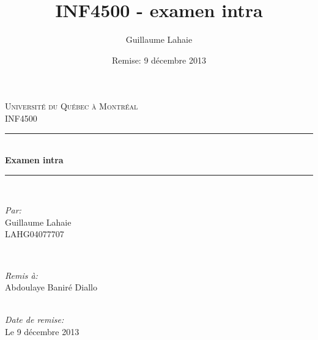 \documentclass[10.9pt]{article} %
\title{INF4500 - examen intra}
\author{Guillaume Lahaie}
\date{Remise: 9 décembre 2013}
\newcommand\blankpage{%
  \null
  \thispagestyle{empty}%
  \addtocounter{page}{-1}%
  \newpage}
\begin{document}
\fussy


\begin{titlepage}

\newcommand{\HRule}{\rule{\linewidth}{0.5mm}} %

\center %

\textsc{\LARGE Université du Québec à Montréal}\\[1.5cm] %
\textsc{\Large INF4500}\\[0.5cm] %

\HRule \\[1.5cm]
{ \huge \bfseries Examen intra}\\[0.4cm] %
\HRule \\[1.5cm]

\begin{minipage}{0.4\textwidth}
\begin{flushleft} \large
\emph{Par:}\\
Guillaume Lahaie \\ LAHG04077707 %
\end{flushleft}
\end{minipage}
~
\begin{minipage}{0.4\textwidth}
\begin{flushright} \large
\emph{Remis à:} \\
Abdoulaye Baniré Diallo %
\end{flushright}
\end{minipage}\\[4cm]

{\large \emph{Date de remise:} \\ Le 9 décembre 2013}\\[3cm] %


\vfill %

\end{titlepage}
\blankpage
\end{document}
